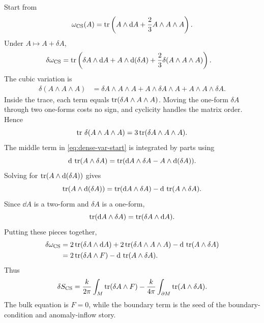 Start from
\begin{equation}
  \omega_{\operatorname{CS}}(A)
  =
  \operatorname{tr}\left(A\wedge\mathrm{d} A+\frac23A\wedge A\wedge A\right).
  \label{eq:dense-cs-form}
\end{equation}
Under $A\mapsto A+\delta A$,
\begin{align}
  \delta\omega_{\operatorname{CS}}
  &=
  \operatorname{tr}\left(
  \delta A\wedge\mathrm{d} A
  +
  A\wedge\mathrm{d}(\delta A)
  +
  \frac23\delta(A\wedge A\wedge A)
  \right).
  \label{eq:dense-var-start}
\end{align}
The cubic variation is
\begin{align}
  \delta(A\wedge A\wedge A)
  &=
  \delta A\wedge A\wedge A
  +
  A\wedge\delta A\wedge A
  +
  A\wedge A\wedge\delta A.
  \label{eq:dense-cubic-var}
\end{align}
Inside the trace, each term equals $\operatorname{tr}(\delta A\wedge A\wedge A)$. Moving the one-form $\delta A$ through two one-forms costs no sign, and cyclicity handles the matrix order. Hence
\begin{equation}
  \operatorname{tr}\,\delta(A\wedge A\wedge A)
  =
  3\operatorname{tr}(\delta A\wedge A\wedge A).
  \label{eq:dense-cubic-var-trace}
\end{equation}
The middle term in \eqref{eq:dense-var-start} is integrated by parts using
\begin{equation}
  \mathrm{d}\,\operatorname{tr}(A\wedge\delta A)
  =
  \operatorname{tr}(\mathrm{d} A\wedge\delta A-A\wedge\mathrm{d}(\delta A)).
  \label{eq:dense-var-boundary-identity}
\end{equation}
Solving for $\operatorname{tr}(A\wedge\mathrm{d}(\delta A))$ gives
\begin{equation}
  \operatorname{tr}(A\wedge\mathrm{d}(\delta A))
  =
  \operatorname{tr}(\mathrm{d} A\wedge\delta A)
  -
  \mathrm{d}\,\operatorname{tr}(A\wedge\delta A).
  \label{eq:dense-var-middle}
\end{equation}
Since $\dd A$ is a two-form and $\delta A$ is a one-form,
\begin{equation}
  \operatorname{tr}(\mathrm{d} A\wedge\delta A)
  =
  \operatorname{tr}(\delta A\wedge\mathrm{d} A).
  \label{eq:dense-var-commute}
\end{equation}
Putting these pieces together,
\begin{align}
  \delta\omega_{\operatorname{CS}}
  &=
  2\operatorname{tr}(\delta A\wedge\mathrm{d} A)
  +
  2\operatorname{tr}(\delta A\wedge A\wedge A)
  -
  \mathrm{d}\,\operatorname{tr}(A\wedge\delta A)
  \notag\\
  &=
  2\operatorname{tr}(\delta A\wedge F)
  -
  \mathrm{d}\,\operatorname{tr}(A\wedge\delta A).
  \label{eq:dense-cs-variation-final}
\end{align}
Thus
\begin{equation}
  \delta S_{\operatorname{CS}}
  =
  \frac{k}{2\pi}\int_M\operatorname{tr}(\delta A\wedge F)
  -
  \frac{k}{4\pi}\int_{\partial M}\operatorname{tr}(A\wedge\delta A).
  \label{eq:dense-action-variation}
\end{equation}
The bulk equation is $F=0$, while the boundary term is the seed of the boundary-condition and anomaly-inflow story.


